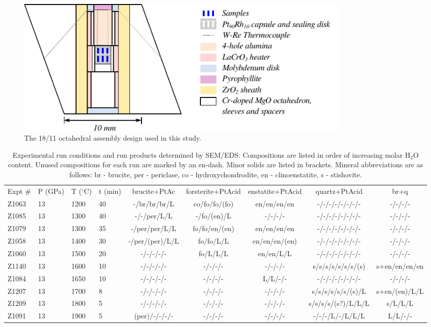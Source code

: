 \documentclass[review]{elsarticle}
\begin{document}
\begin{figure}[h!]
  \centering
      \includegraphics[width=0.8\textwidth]{figures/assembly}
  \caption{The 18/11 octahedral assembly design used in this study.}
  \label{fig:assembly}
\end{figure}

\begin{landscape}
\begin{table}[ht!]
\caption{Experimental run conditions and run products determined by SEM/EDS. Compositions are listed in order of increasing molar H$_2$O content. Unused compositions for each run are marked by an en-dash. Minor solids are listed in brackets. Mineral abbreviations are as follows: br - brucite, per - periclase, co - hydroxychondrodite, en - clinoenstatite, s - stishovite.}
\label{table:experiments}
\begin{tabular}{llllccccc}
Expt \# & P (GPa) & T ($^{\circ}$C) & t (min) & brucite+PtAc & forsterite+PtAcid & enstatite+PtAcid & quartz+PtAcid & br+q \\
Z1063 & 13 & 1200 & 40 & -/br/br/br/L & co/fo/fo/(fo) & en/en/en/en & -/-/-/-/-/-/-/- & -/-/-/- \\
Z1085 & 13 & 1300 & 40 & -/-/per/L/L & -/fo/(en)/L & -/-/-/- & -/-/-/-/-/-/-/- & -/-/-/- \\
Z1079 & 13 & 1300 & 35 & -/per/per/L/L & fo/fo/en/(en) & en/en/en/en & -/-/-/-/-/-/-/- & -/-/-/- \\
Z1058 & 13 & 1400 & 30 & -/per/(per)/L/L & fo/fo/L/L & en/en/en/(en) & -/-/-/-/-/-/-/- & -/-/-/- \\
Z1060 & 13 & 1500 & 20 & -/-/-/-/- & fo/L/L/L & en/en/L/L & -/-/-/-/-/-/-/- & -/-/-/- \\
Z1140 & 13 & 1600 & 10 & -/-/-/-/- & -/-/-/- & -/-/-/- & s/s/s/s/s/s/s/(s) & s+en/en/en/en \\
Z1084 & 13 & 1650 & 10 & -/-/-/-/- & -/-/-/- & L/L/-/- & -/-/-/-/-/-/-/- & -/-/-/- \\
Z1207 & 13 & 1700 & 8 & -/-/-/-/- & -/-/-/- & -/-/-/- & s/s/s/s/s/s/(s)/L & s+en/(en)/L/L \\
Z1209 & 13 & 1800 & 5 & -/-/-/-/- & -/-/-/- & -/-/-/- & s/s/s/s/(s?)/L/L/L & s/L/L/L \\
Z1091 & 13 & 1900 & 5 & (per)/-/-/-/- & -/-/-/- & -/-/-/- & -/-/-/L/-/L/L/L & L/L/-/-
\end{tabular}
\end{table}
\end{landscape}
\end{document}
